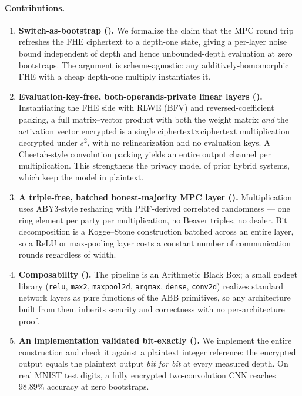 \documentclass[11pt]{article}
\theoremstyle{plain}
\theoremstyle{definition}
\theoremstyle{remark}
\newcommand{\bt}[1]{\texttt{#1}}
\begin{document}
\paragraph{Contributions.}
\begin{enumerate}
\item \textbf{Switch-as-bootstrap ().} We formalize
the claim that the MPC round trip refreshes the FHE ciphertext to a
depth-one state, giving a per-layer noise bound independent of depth and
hence unbounded-depth evaluation at zero bootstraps. The argument is
scheme-agnostic: any additively-homomorphic FHE with a cheap depth-one
multiply instantiates it.

\item \textbf{Evaluation-key-free, both-operands-private linear layers
().} Instantiating the FHE side with RLWE (BFV) and
reversed-coefficient packing, a full matrix--vector product with both the
weight matrix \emph{and} the activation vector encrypted is a single
ciphertext$\times$ciphertext multiplication decrypted under $s^2$, with no
relinearization and no evaluation keys. A Cheetah-style convolution packing
yields an entire output channel per multiplication. This strengthens the
privacy model of prior hybrid systems, which keep the model in plaintext.

\item \textbf{A triple-free, batched honest-majority MPC layer
().} Multiplication uses ABY3-style resharing with PRF-derived
correlated randomness --- one ring element per party per multiplication, no
Beaver triples, no dealer. Bit decomposition is a Kogge--Stone construction
batched across an entire layer, so a ReLU or max-pooling layer costs a
constant number of communication rounds regardless of width.

\item \textbf{Composability ().} The pipeline is an Arithmetic
Black Box; a small gadget library (\bt{relu}, \bt{max2}, \bt{maxpool2d},
\bt{argmax}, \bt{dense}, \bt{conv2d}) realizes standard network layers as
pure functions of the ABB primitives, so any architecture built from them
inherits security and correctness with no per-architecture proof.

\item \textbf{An implementation validated bit-exactly
().} We implement the entire construction and check it against
a plaintext integer reference: the encrypted output equals the plaintext
output \emph{bit for bit} at every measured depth. On real MNIST test
digits, a fully encrypted two-convolution CNN reaches $98.89\%$ accuracy at
zero bootstraps.


\end{enumerate}
\end{document}

